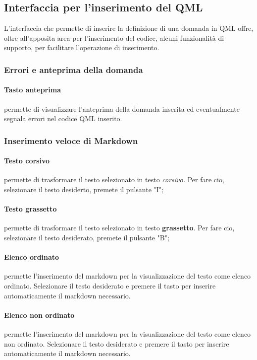 \documentclass[12pt,a4paper]{article}
\begin{document}
	\subsection{Interfaccia per l'inserimento del QML}
	L'interfaccia che permette di inserire la definizione di una domanda in QML offre, oltre all'apposita area per l'inserimento del codice, alcuni funzionalità di supporto, per facilitare l'operazione di inserimento.
	\subsubsection{Errori e anteprima della domanda}
	\paragraph{Tasto anteprima} permette di visualizzare l'anteprima della domanda inserita ed eventualmente segnala errori nel codice QML inserito.
	\subsubsection{Inserimento veloce di Markdown}
	\paragraph{Testo corsivo} permette di trasformare il testo selezionato in testo\textit{ corsivo.} 
	Per fare cio, selezionare il testo desiderto, premete il pulsante "I";
	\paragraph{Testo grassetto} permette di trasformare il testo selezionato in testo \textbf{grassetto}. 
	Per fare cio, selezionare il testo desiderato, premete il pulsante "B";
	\paragraph{Elenco ordinato} permette l'inserimento del markdown per la visualizzazione del testo come elenco ordinato. 
	Selezionare il testo desiderato e premere il tasto per inserire automaticamente il markdown necessario.
	\paragraph{Elenco non ordinato}permette l'inserimento del markdown per la visualizzazione del testo come elenco non ordinato. 
	Selezionare il testo desiderato e premere il tasto per inserire automaticamente il markdown necessario.
\end{document}
